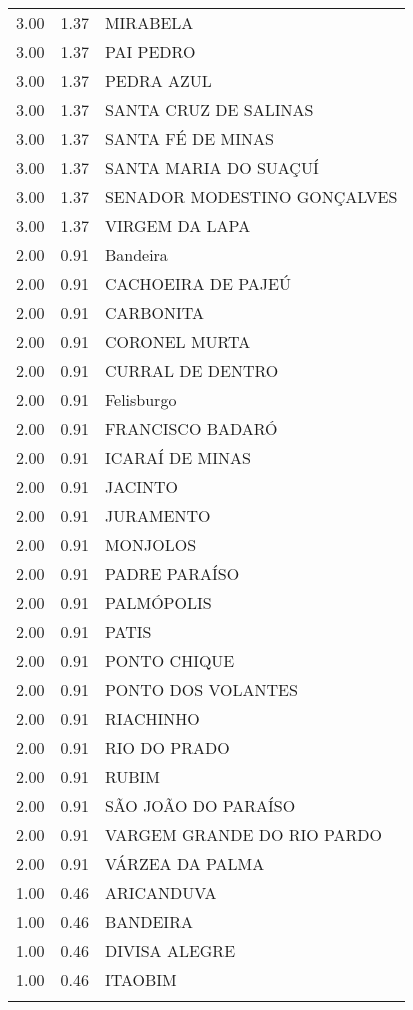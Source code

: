 \documentclass[a4paper, 12pt, openright, oneside, english, brazil, article]{abntex2}
\begin{document}
\begin{scriptsize}
\begin{longtable}{rrl}
		3.00 & 1.37 & MIRABELA \\ 
		3.00 & 1.37 & PAI PEDRO \\ 
		3.00 & 1.37 & PEDRA AZUL \\ 
		3.00 & 1.37 & SANTA CRUZ DE SALINAS \\ 
		3.00 & 1.37 & SANTA FÉ DE MINAS \\ 
		3.00 & 1.37 & SANTA MARIA DO SUAÇUÍ \\ 
		3.00 & 1.37 & SENADOR MODESTINO GONÇALVES \\ 
		3.00 & 1.37 & VIRGEM DA LAPA \\ 
		2.00 & 0.91 & Bandeira \\ 
		2.00 & 0.91 & CACHOEIRA DE PAJEÚ \\ 
		2.00 & 0.91 & CARBONITA \\ 
		2.00 & 0.91 & CORONEL MURTA \\ 
		2.00 & 0.91 & CURRAL DE DENTRO \\ 
		2.00 & 0.91 & Felisburgo \\ 
		2.00 & 0.91 & FRANCISCO BADARÓ \\ 
		2.00 & 0.91 & ICARAÍ DE MINAS \\ 
		2.00 & 0.91 & JACINTO \\ 
		2.00 & 0.91 & JURAMENTO \\ 
		2.00 & 0.91 & MONJOLOS \\ 
		2.00 & 0.91 & PADRE PARAÍSO \\ 
		2.00 & 0.91 & PALMÓPOLIS \\ 
		2.00 & 0.91 & PATIS \\ 
		2.00 & 0.91 & PONTO CHIQUE \\ 
		2.00 & 0.91 & PONTO DOS VOLANTES \\ 
		2.00 & 0.91 & RIACHINHO \\ 
		2.00 & 0.91 & RIO DO PRADO \\ 
		2.00 & 0.91 & RUBIM \\ 
		2.00 & 0.91 & SÃO JOÃO DO PARAÍSO \\ 
		2.00 & 0.91 & VARGEM GRANDE DO RIO PARDO \\ 
		2.00 & 0.91 & VÁRZEA DA PALMA \\ 
		1.00 & 0.46 & ARICANDUVA \\ 
		1.00 & 0.46 & BANDEIRA \\ 
		1.00 & 0.46 & DIVISA ALEGRE \\ 
		1.00 & 0.46 & ITAOBIM \\ 
		\hline
		\hline
		\label{semoutorga}
	\end{longtable}
	\end{scriptsize}	
	
\end{document}
